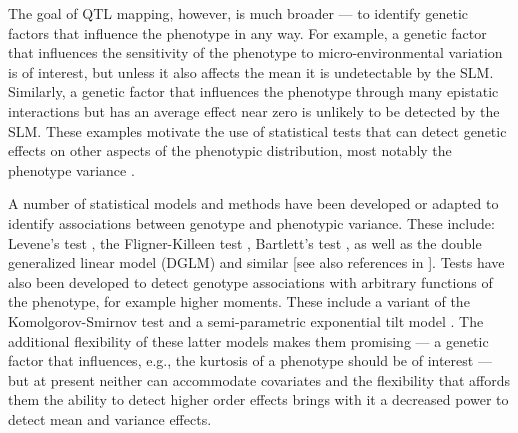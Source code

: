 
The goal of QTL mapping, however, is much broader --- to identify genetic factors that influence the phenotype in any way.
For example, a genetic factor that influences the sensitivity of the phenotype to micro-environmental variation is of interest, but unless it also affects the mean it is undetectable by the SLM.
Similarly, a genetic factor that influences the phenotype through many epistatic interactions but has an average effect near zero is unlikely to be detected by the SLM.
These examples motivate the use of statistical tests that can detect genetic effects on other aspects of the phenotypic distribution, most notably the phenotype variance \citep{Pare2010}.

A number of statistical models and methods have been developed or adapted to identify associations between genotype and phenotypic variance. 
These include: 
    Levene's test \citep{Struchalin2010},
    the Fligner-Killeen test \citep{Fraser2010},
    Bartlett's test \citep{Freund2013b},
    as well as the double generalized linear model (DGLM) and similar \citep{Ronnegard2011a, Cao2014} [see also references in \citep{Ronnegard2012}].
Tests have also been developed to detect genotype associations with arbitrary functions of the phenotype, for example higher moments.
These include a variant of the Komolgorov-Smirnov test \citep{Aschard2013} and a semi-parametric exponential tilt model \citep{Hong2016}.
The additional flexibility of these latter models makes them promising --- a genetic factor that influences, e.g., the kurtosis of a phenotype should be of interest --- but at present neither can accommodate covariates and the flexibility that affords them the ability to detect higher order effects brings with it a decreased power to detect mean and variance effects. 


